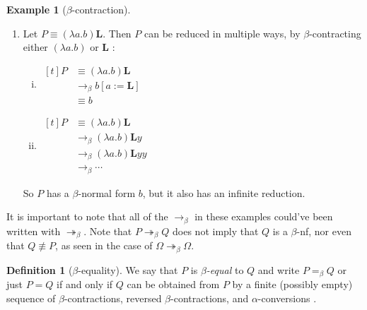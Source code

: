 \documentclass[a4paper, 11pt]{article}
\theoremstyle{plain}
\theoremstyle{definition}
\newtheorem{defn}{Definition}[section]
\newtheorem{example}{Example}[section]
\theoremstyle{remark}
\newcommand\bcon{\mathrel{\rightarrow_\beta}}
\newcommand\bred{\mathrel{\twoheadrightarrow_\beta}}
\begin{document}
\begin{example}[$\beta$-contraction]
\begin{enumerate}[(1)]
In this example, the $\beta$-contraction process actually makes the expression more `complicated' (in the sense of containing more terms). The initial term $(\lambda x . xxy) (\lambda x . xxy)$ is called $\mathbf{L}$, and it has no $\beta$-normal form \parencite[p.~12]{hindley-seldin-2008-lambda-calculus-and-combinators}.

\item Let $P \equiv (\lambda a . b) \mathbf{L}$. Then $P$ can be reduced in multiple ways, by $\beta$-contracting either $(\lambda a . b)$ or $\mathbf{L}$ \parencite[pp.~11--12]{hindley-seldin-2008-lambda-calculus-and-combinators}:
\begin{enumerate}[(i)]
    \item $\begin{aligned}[t]
    P &\equiv (\lambda a . b) \mathbf{L} \\
        &\bcon b [a := \mathbf{L}] \\
        &\equiv b
    \end{aligned}$

    \item $\begin{aligned}[t]
    P &\equiv (\lambda a . b) \mathbf{L} \\
        &\bcon (\lambda a . b) \mathbf{L} y \\
        &\bcon (\lambda a . b) \mathbf{L} yy \\
        &\bcon \dotsb
    \end{aligned}$
\end{enumerate}
So $P$ has a $\beta$-normal form $b$, but it also has an infinite reduction.
\end{enumerate}

It is important to note that all of the $\bcon$ in these examples could've been written with $\bred$. Note that
$P \bred Q$ does not imply that $Q$ is a $\beta$-nf, nor even that $Q \not\equiv P$, as seen in the case of $\Omega \bred \Omega$.
\end{example}

\begin{defn}[$\beta$-equality]
We say that $P$ is \textit{$\beta$-equal} to $Q$ and write $P =_\beta Q$ or just $P = Q$ if and only if $Q$ can be obtained from $P$ by a finite (possibly empty) sequence of $\beta$-contractions, reversed $\beta$-contractions, and $\alpha$-conversions \parencite[p.~16]{hindley-seldin-2008-lambda-calculus-and-combinators}.
\end{defn}
\end{document}
